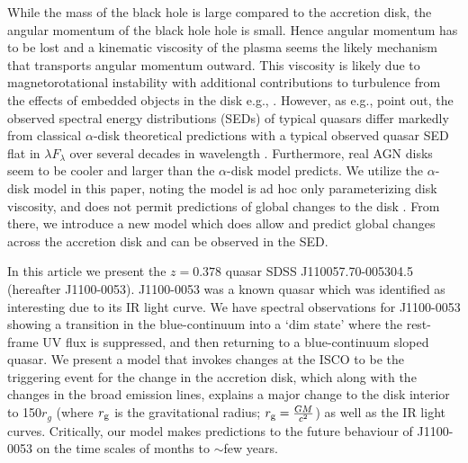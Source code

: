 \documentclass{nature}
\begin{document}
While the mass of the black hole is large compared to the accretion
disk, the angular momentum of the black hole hole is small. Hence
angular momentum has to be lost and a kinematic viscosity of the
plasma seems the likely mechanism that transports angular momentum
outward.  This viscosity is likely due to magnetorotational
instability \citep[MRI; ][]{Balbus_Hawley1991} with additional
contributions to turbulence from the effects of embedded objects in
the disk e.g., \cite{McKernan2014}.  However, as e.g.,
\cite{Koratkar_Blaes1999, Sirko_Goodman2003} point out, the observed
spectral energy distributions (SEDs) of typical quasars differ
markedly from classical $\alpha$-disk theoretical predictions
\citep[][]{SS73, Pringle1981} with a typical observed quasar SED flat
in $\lambda F_{\lambda}$ over several decades in wavelength
\citep{Elvis1994, Richards2006b}. Furthermore, real AGN disks seem to
be cooler \cite[e.g., ][]{Lawrence2012} and larger
\cite[e.g.,][]{Pooley2007, Morgan2010, Morgan2012, Mosquera2011} than
the $\alpha$-disk model predicts. We utilize the $\alpha$-disk model
in this paper, noting the model is ad hoc only parameterizing disk
viscosity, and does not permit predictions of global changes to the
disk \cite{King2012}. From there, we introduce a new model which does
allow and predict global changes across the accretion disk and can be
observed in the SED.

In this article we present the $z=0.378$ quasar SDSS
J110057.70-005304.5 (hereafter J1100-0053).  J1100-0053 was a known
quasar which was identified as interesting due to its IR light
curve. We have spectral observations for J1100-0053 showing a
transition in the blue-continuum into a `dim state' where the
rest-frame UV flux is suppressed, and then returning to a
blue-continuum sloped quasar.  We present a model that invokes changes
at the ISCO to be the triggering event for the change in the accretion
disk, which along with the changes in the broad emission lines,
explains a major change to the disk interior to 150$r_{g}$ (where
$r_{\rm g}$ is the gravitational radius; $r_{\rm g}=\frac{GM}{c^2}$)
as well as the IR light curves. Critically, our model makes
predictions to the future behaviour of J1100-0053 on the time scales
of months to $\sim$few years.
\end{document}
